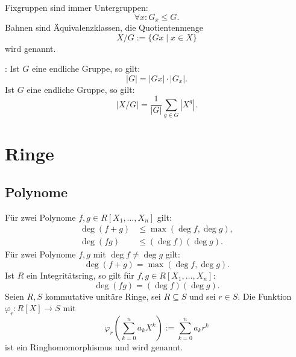 Fixgruppen sind immer Untergruppen:
\begin{equation}
\forall x\colon G_x\le G.
\end{equation}
Bahnen sind Äquivalenzklassen, die Quotientenmenge
\begin{equation}
X/G := \{Gx\mid x\in X\}
\end{equation}
wird  genannt.

\noindent
{}:
Ist $G$ eine endliche Gruppe, so gilt:
\begin{equation}
|G| = |Gx|\cdot |G_x|.
\end{equation}
Ist $G$ eine endliche Gruppe, so gilt:
\begin{equation}
|X/G| = \frac{1}{|G|}\sum_{g\in G}|X^g|.
\end{equation}

\section{Ringe}
\subsection{Polynome}
Für zwei Polynome $f,g\in R[X_1,\ldots,X_n]$ gilt:
\begin{align}
\deg(f+g)&\le \max(\deg f,\deg g),\\
\deg(fg)&\le (\deg f)(\deg g).
\end{align}
Für zwei Polynome $f,g$ mit $\deg f\ne\deg g$ gilt:
\begin{equation}
\deg(f+g) = \max(\deg f,\deg g).
\end{equation}
Ist $R$ ein Integritätsring, so gilt für $f,g\in R[X_1,\ldots,X_n]$:%
\begin{equation}
\deg(fg) = (\deg f)(\deg g).
\end{equation}
Seien $R,S$ kommutative unitäre Ringe, sei $R\subseteq S$
und sei $r\in S$.
Die Funktion $\varphi_r\colon R[X]\to S$ mit
\begin{equation}\textstyle
\varphi_r(\sum_{k=0}^n a_k X^k):=\sum_{k=0}^n a_k r^k 
\end{equation}
ist ein Ringhomomorphismus und wird
genannt.
\begin{equation}
\end{equation}

